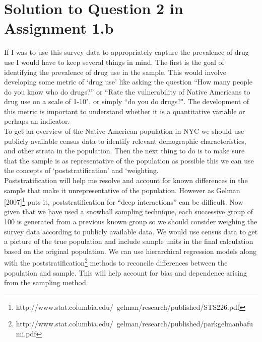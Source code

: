 \documentclass{article}
\begin{document}
\section{Solution to Question 2 in Assignment 1.b}
If I was to use this survey data to appropriately capture the prevalence of drug use I would have to keep several things in mind. The first is the goal of identifying the prevalence of drug use in the sample. This would involve developing some metric of `drug use' like asking the question ``How many people do you know who do drugs?'' or ``Rate the vulnerability of Native Americans to drug use on a scale of 1-10", or simply ``do you do drugs?". The development of this metric is important to understand whether it is a quantitative variable or perhaps an indicator. \\
To get an overview of the Native American population in NYC we should use publicly available census data to identify relevant demographic characteristics, and other strata in the population. Then the next thing to do is to make sure that the sample is as representative of the population as possible this we can use the concepts of `poststratification' and `weighting.\\
 Poststratification will help me resolve and account for known differences in the sample that make it unrepresentative of the population. However as Gelman [2007]\footnote{http://www.stat.columbia.edu/~gelman/research/published/STS226.pdf} puts it, poststratification for ``deep interactions'' can be difficult. Now given that we have used a snowball sampling technique, each successive group of 100 is generated from a previous known group so we should consider weighing the survey data according to publicly available data. We would use census data to get a picture of the true population and include sample units in the final calculation based on the original population. We can use hierarchical regression models along with the poststratification\footnote{http://www.stat.columbia.edu/~gelman/research/published/parkgelmanbafumi.pdf} methods to reconcile differences between the population and sample. This will help account for bias and dependence arising from the sampling method.
\end{document}

